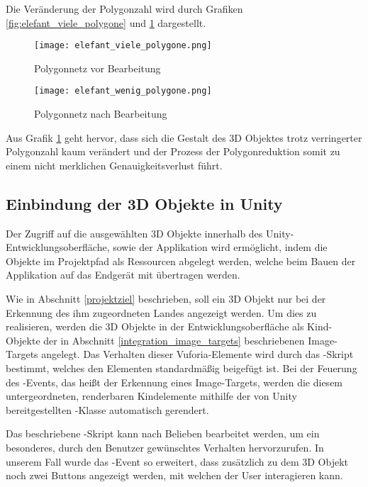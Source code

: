 Die Veränderung der Polygonzahl wird durch Grafiken \ref{fig:elefant_viele_polygone} und \ref{fig:elefant_wenig_polygone} dargestellt.

\begin{figure}[!htb]
  \texttt{[image: elefant\_viele\_polygone.png]}
  \caption{Polygonnetz vor Bearbeitung}\label{fig:elefant_viele_polygone}
\endminipage\hfill
{}
  \texttt{[image: elefant\_wenig\_polygone.png]}
  \caption{Polygonnetz nach Bearbeitung}\label{fig:elefant_wenig_polygone}
\endminipage\hfill
\end{figure}

Aus Grafik \ref{fig:elefant_wenig_polygone} geht hervor, dass sich die Gestalt des 3D Objektes trotz verringerter Polygonzahl kaum verändert und der Prozess der Polygonreduktion somit zu einem nicht merklichen Genauigkeitsverlust führt.
\subsection{Einbindung der 3D Objekte in Unity}\label{einbindung_3D_objekte}
Der Zugriff auf die ausgewählten 3D Objekte innerhalb des Unity-Entwicklungsoberfläche, sowie der Applikation wird ermöglicht, indem die Objekte im Projektpfad als Ressourcen abgelegt werden, welche beim Bauen der Applikation auf das Endgerät mit übertragen werden. 

Wie in Abschnitt \ref{projektziel} beschrieben, soll ein 3D Objekt nur bei der Erkennung des ihm zugeordneten Landes angezeigt werden.
Um dies zu realisieren, werden die 3D Objekte in der Entwicklungsoberfläche als Kind-Objekte der in Abschnitt \ref{integration_image_targets} beschriebenen Image-Targets angelegt.
Das Verhalten dieser Vuforia-Elemente wird durch das -Skript bestimmt, welches den Elementen standardmäßig beigefügt ist. 
Bei der Feuerung des -Events, das heißt der Erkennung eines Image-Targets, werden die diesem untergeordneten, renderbaren Kindelemente mithilfe der von Unity bereitgestellten -Klasse automatisch gerendert.

Das beschriebene -Skript kann nach Belieben bearbeitet werden, um ein besonderes, durch den Benutzer gewünschtes Verhalten hervorzurufen.
In unserem Fall wurde das -Event so erweitert, dass zusätzlich zu dem 3D Objekt noch zwei Buttons angezeigt werden, mit welchen der User interagieren kann.

